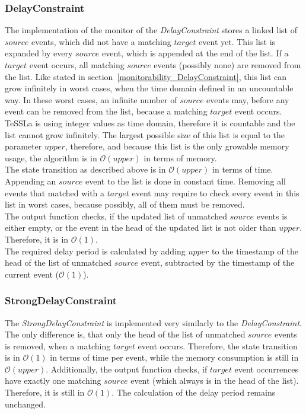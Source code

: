 \subsubsection{DelayConstraint}
	The implementation of the monitor of the \emph{DelayConstraint} stores a linked list of $source$ events, which did not have a matching $target$ event yet. This list is expanded by every $source$ event, which is appended at the end of the list. If a $target$ event occurs, all matching $source$ events (possibly none) are removed from the list. Like stated in section~\ref{monitorability_DelayConstraint}, this list can grow infinitely in worst cases, when the time domain defined in an uncountable way. In these worst cases, an infinite number of $source$ events may, before any event can be removed from the list, because a matching $target$ event occurs.\\
	TeSSLa is using integer values as time domain, therefore it is countable and the list cannot grow infinitely. The largest possible size of this list is equal to the parameter $upper$, therefore, and because this list is the only growable memory usage, the algorithm is in $\mathcal{O}(upper)$ in terms of memory.\\
	The state transition as described above is in  $\mathcal{O}(upper)$ in terms of time. Appending an $source$ event to the list is done in constant time. Removing all events that matched with a $target$ event may require to check every event in this list in worst cases, because possibly, all of them must be removed.\\
	The output function checks, if the updated list of unmatched $source$ events is either empty, or the event in the head of the updated list is not older than $upper$. Therefore, it is in $\mathcal{O}(1)$.\\
	The required delay period is calculated by adding $upper$ to the timestamp of the head of the list of unmatched $source$ event, subtracted by the timestamp of the current event ($\mathcal{O}(1)$).
	
\subsubsection{StrongDelayConstraint}
	The \emph{StrongDelayConstraint} is implemented very similarly to the \emph{DelayConstraint}. The only difference is, that only the head of the list of unmatched $source$ events is removed, when a matching $target$ event occurs. Therefore, the state transition is in $\mathcal{O}(1)$ in terms of time per event, while the memory consumption is still in  $\mathcal{O}(upper)$. Additionally, the output function checks, if $target$ event occurrences have exactly one matching $source$ event (which always is in the head of the list). Therefore, it is still in $\mathcal{O}(1)$. The calculation of the delay period remains unchanged.
	

